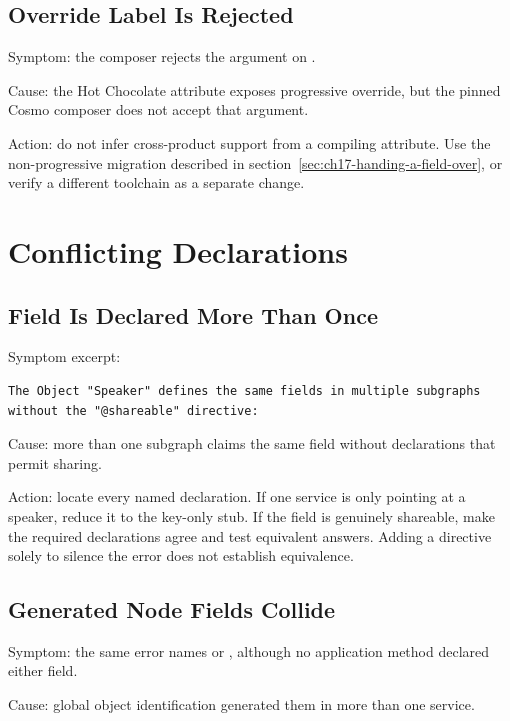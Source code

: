 \subsection*{Override Label Is Rejected}

Symptom: the composer rejects the  argument on .

Cause: the Hot Chocolate attribute exposes progressive override, but the
pinned Cosmo composer does not accept that argument.

Action: do not infer cross-product support from a compiling attribute.
Use the non-progressive migration described in
section~\ref{sec:ch17-handing-a-field-over}, or verify a different toolchain
as a separate change.

\section{Conflicting Declarations}

\subsection*{Field Is Declared More Than Once}

Symptom excerpt:

\begin{verbatim}
The Object "Speaker" defines the same fields in multiple subgraphs without the "@shareable" directive:
\end{verbatim}

Cause: more than one subgraph claims the same field without declarations
that permit sharing.

Action: locate every named declaration. If one service is only pointing at
a speaker, reduce it to the key-only stub. If the field is genuinely
shareable, make the required declarations agree and test equivalent answers.
Adding a directive solely to silence the error does not establish equivalence.

\subsection*{Generated Node Fields Collide}

Symptom: the same error names  or ,
although no application method declared either field.

Cause: global object identification generated them in more than one service.

